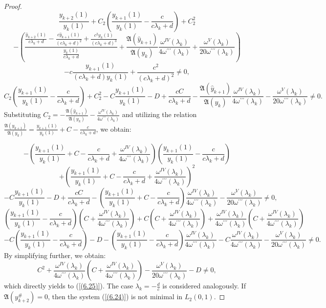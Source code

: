 \documentclass[pdflatex,sn-mathphys-num]{sn-jnl}%
\theoremstyle{thmstyleone}%
\theoremstyle{thmstyletwo}%
\theoremstyle{thmstylethree}%
\theoremstyle{definition}
\theoremstyle{remark}
\numberwithin{equation}{section}
\begin{document}
\begin{proof}
$$
\frac{y_{k+2}(1)}{y_k(1)} + C_2\left(\frac{y_{k+1}(1)}{y_k(1)} - \frac{c}{c\lambda_k+d}\right) + C_2^2 $$
$$- \left( \frac{\frac{\hat{y}_{k+2}(1)}{c\lambda_k+d} - \frac{c\hat{y}_{k+1}(1)}{(c\lambda_k+d)^2} + \frac{c^2y_k(1)}{(c\lambda_k+d)^3}}{\frac{y_k(1)}{c\lambda_k+d}} + \frac{\mathfrak{A}(\hat{y}_{k+1})}{\mathfrak{A}(y_k)}\frac{\omega^{IV}(\lambda_k)}{4\omega^{\prime\prime\prime}(\lambda_k)} + \frac{\omega^{V}(\lambda_k)}{20\omega^{\prime\prime\prime}(\lambda_k)} \right) $$
$$- c\frac{y_{k+1}(1)}{(c\lambda_k+d)y_k(1)} + \frac{c^2}{(c\lambda_k+d)^2} \neq 0,
$$
$$
C_2\left(\frac{y_{k+1}(1)}{y_k(1)} - \frac{c}{c\lambda_k+d}\right) + C_2^2 - C\frac{y_{k+1}(1)}{y_k(1)} - D + \frac{cC}{c\lambda_k+d} - \frac{\mathfrak{A}(\hat{y}_{k+1})}{\mathfrak{A}(y_k)}\frac{\omega^{IV}(\lambda_k)}{4\omega^{\prime\prime\prime}(\lambda_k)} - \frac{\omega^{V}(\lambda_k)}{20\omega^{\prime\prime\prime}(\lambda_k)} \neq 0.
$$
Substituting $C_2 = -\frac{\mathfrak{A}(\hat{y}_{k+1})}{\mathfrak{A}(y_k)} - \frac{\omega^{IV}(\lambda_k)}{4\omega^{\prime\prime\prime}(\lambda_k)}$ and utilizing the relation $\frac{\mathfrak{A}(\hat{y}_{k+1})}{\mathfrak{A}(y_k)} = \frac{y_{k+1}(1)}{y_k(1)} + C - \frac{c}{c\lambda_k+d}$, we obtain:

$$
-\left(\frac{y_{k+1}(1)}{y_k(1)} + C - \frac{c}{c\lambda_k+d} + \frac{\omega^{IV}(\lambda_k)}{4\omega^{\prime\prime\prime}(\lambda_k)}\right)\left(\frac{y_{k+1}(1)}{y_k(1)} - \frac{c}{c\lambda_k+d}\right)$$
$$+ \left(\frac{y_{k+1}(1)}{y_k(1)} + C - \frac{c}{c\lambda_k+d} + \frac{\omega^{IV}(\lambda_k)}{4\omega^{\prime\prime\prime}(\lambda_k)}\right)^2 
$$
$$
- C\frac{y_{k+1}(1)}{y_k(1)} - D + \frac{cC}{c\lambda_k+d} - \left(\frac{y_{k+1}(1)}{y_k(1)} + C - \frac{c}{c\lambda_k+d}\right)\frac{\omega^{IV}(\lambda_k)}{4\omega^{\prime\prime\prime}(\lambda_k)} - \frac{\omega^{V}(\lambda_k)}{20\omega^{\prime\prime\prime}(\lambda_k)} \neq 0,
$$
$$
\left(\frac{y_{k+1}(1)}{y_k(1)} - \frac{c}{c\lambda_k+d}\right)\left(C + \frac{\omega^{IV}(\lambda_k)}{4\omega^{\prime\prime\prime}(\lambda_k)}\right) + C\left(C + \frac{\omega^{IV}(\lambda_k)}{4\omega^{\prime\prime\prime}(\lambda_k)}\right) + \frac{\omega^{IV}(\lambda_k)}{4\omega^{\prime\prime\prime}(\lambda_k)}\left(C + \frac{\omega^{IV}(\lambda_k)}{4\omega^{\prime\prime\prime}(\lambda_k)}\right) 
$$
$$
- C\left(\frac{y_{k+1}(1)}{y_k(1)} - \frac{c}{c\lambda_k+d}\right) - D - \left(\frac{y_{k+1}(1)}{y_k(1)} - \frac{c}{c\lambda_k+d}\right)\frac{\omega^{IV}(\lambda_k)}{4\omega^{\prime\prime\prime}(\lambda_k)} - C\frac{\omega^{IV}(\lambda_k)}{4\omega^{\prime\prime\prime}(\lambda_k)} - \frac{\omega^{V}(\lambda_k)}{20\omega^{\prime\prime\prime}(\lambda_k)} \neq 0.
$$
By simplifying further, we obtain:
$$
C^2 + \frac{\omega^{IV}(\lambda_k)}{4\omega^{\prime\prime\prime}(\lambda_k)}\left(C + \frac{\omega^{IV}(\lambda_k)}{4\omega^{\prime\prime\prime}(\lambda_k)}\right) - \frac{\omega^{V}(\lambda_k)}{20\omega^{\prime\prime\prime}(\lambda_k)} - D \neq 0,
$$
which directly yields to (\ref{(6.25)}).
The case $\lambda_k=-\frac{d}{c}$ is considered analogously. If $\mathfrak{A}(y_{k+2}^{\#})=0$, then the system (\ref{(6.24)}) is not minimal in $L_2(0,1)$.
\end{proof}
\end{document}
